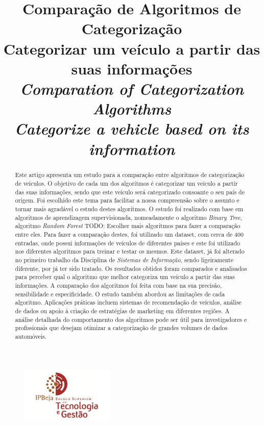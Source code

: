 \documentclass[conference]{IEEEtran}
\title{Comparação de Algoritmos de Categorização \\ \large Categorizar um veículo a partir das suas informações \\
\textit{Comparation of Categorization Algorithms \\ \large Categorize a vehicle based on its information}}
\author{
\IEEEauthorblockN{Martinho Caeiro - 23917 || Paulo Abade - 23919}
\IEEEauthorblockA{
    Instituto Politécnico de Beja\\
    Escola Superior de Tecnologia e Gestão\\
    Beja, Portugal\\
    23917@stu.ipbeja.pt || 23919@stu.ipbeja.pt
}
}
\begin{document}
\maketitle
\begin{figure}[!ht]
	\centering
	\includegraphics[width=0.4\textwidth]{Resources/Logo/IPBejaESTIG.jpg}
\end{figure}

\begin{abstract}
	Este artigo apresenta um estudo para a comparação entre algoritmos de categorização de veículos. O objetivo de cada um dos
	algoritmos é categorizar um veículo a partir das suas informações, sendo que este veículo será categorizado consoante o seu
	país de origem. Foi escolhido este tema para facilitar a nossa compreensão sobre o assunto e tornar mais agradável o estudo
	destes algoritmos. O estudo foi realizado com base em algoritmos de aprendizagem supervisionada, nomeadamente o algoritmo
	\textit{Binary Tree}, algoritmo \textit{Random Forest} TODO: Escolher mais algoritmos para fazer a comparação entre eles.
	Para fazer a comparação destes, foi utilizado um dataset, com cerca de 400 entradas, onde possui informações de veículos de
	diferentes países e este foi utilizado nos diferentes algoritmos para treinar e testar os mesmos. Este dataset, já foi alterado
	no primeiro trabalho da Disciplina de \textit{Sistemas de Informação}, sendo ligeiramente diferente, por já ter sido tratado.
	Os resultados obtidos foram comparados e analisados para perceber qual o algoritmo que melhor categoriza um veículo a partir das
	suas informações. A comparação dos algoritmos foi feita com base na sua precisão, sensibilidade e especificidade. O estudo também
	abordou as limitações de cada algoritmo. Aplicações práticas incluem sistemas de recomendação de veículos, análise de dados ou apoio
	à criação de estratégias de marketing em diferentes regiões. A análise detalhada do comportamento dos algoritmos pode ser útil
	para investigadores e profissionais que desejam otimizar a categorização de grandes volumes de dados automóveis.

\end{abstract}
\end{document}
